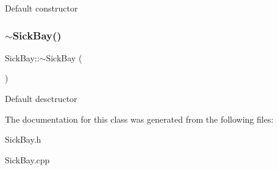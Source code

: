 Default constructor \mbox{\label{classSickBay_a527219ede6b1a75938fef90ecc0b7755}} 
\subsubsection{\texorpdfstring{$\sim$\+Sick\+Bay()}{~SickBay()}}
{\footnotesize\ttfamily Sick\+Bay\+::$\sim$\+Sick\+Bay (\begin{DoxyParamCaption}{ }\end{DoxyParamCaption})}

Default desctructor 

The documentation for this class was generated from the following files\+:\begin{DoxyCompactItemize}
\item 
Sick\+Bay.\+h\item 
Sick\+Bay.\+cpp\end{DoxyCompactItemize}
